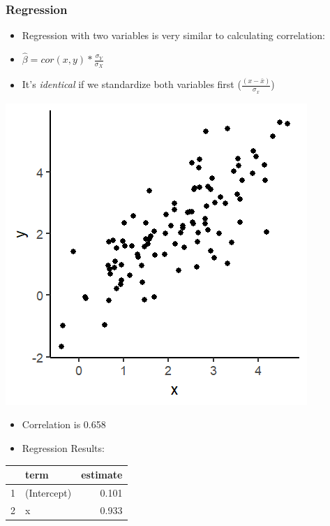 \documentclass[xcolor=x11names,compress]{beamer}\usepackage[]{graphicx}\usepackage[]{color}
\makeatletter
\def\maxwidth{ %
  \ifdim\Gin@nat@width>\linewidth
    \linewidth
  \else
    \Gin@nat@width
  \fi
}
\newenvironment{knitrout}{}{} %
\renewcommand{\(}{\begin{columns}}
\renewcommand{\)}{\end{columns}}
\newcommand{\<}[1]{\begin{column}{#1}}
\renewcommand{\>}{\end{column}}
\makeatother
\begin{document}
\begin{frame}
\frametitle{Regression}
\begin{itemize}
\item Regression with two variables is very similar to calculating correlation:
\item $\hat{\beta}=cor(x,y) * \frac{\sigma_Y}{\sigma_X}$
\item It's \textit{identical} if we standardize both variables first ($\frac{(x-\bar{x})}{\sigma_x}$)
\end{itemize}
\begin{multicols}{2}
\begin{knitrout}
\color{fgcolor}
\includegraphics[width=\maxwidth]{figure/corr_regn_fig2-1} 

\end{knitrout}
\columnbreak
\begin{itemize}
\item Correlation is 0.658
\pause
\item Regression Results:
\end{itemize}
\begin{table}[ht]
\centering
\begin{tabular}{rlr}
  \hline
 & term & estimate \\ 
  \hline
1 & (Intercept) & 0.101 \\ 
  2 & x & 0.933 \\ 
   \hline
\end{tabular}
\end{table}

\end{multicols}
\end{frame}
\end{document}

